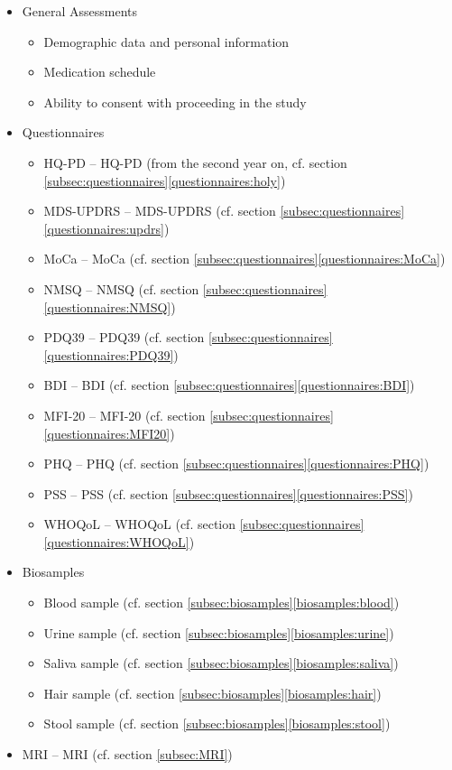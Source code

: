 \begin{itemize}[noitemsep,topsep=0pt]
\item General Assessments
\begin{itemize}[noitemsep,topsep=0pt]
\item Demographic data and personal information
\item Medication schedule
\item Ability to consent with proceeding in the study
\end{itemize}
\item Questionnaires
\begin{itemize}[noitemsep,topsep=0pt]
\item \acl{HQ-PD} -- \acs{HQ-PD} (from the second year on, cf. section \ref{subsec:questionnaires}\ref{questionnaires:holy})
\item \acl{MDS-UPDRS} -- \acs{MDS-UPDRS} (cf. section \ref{subsec:questionnaires}\ref{questionnaires:updrs})
\item \acl{MoCa} -- \acs{MoCa} (cf. section \ref{subsec:questionnaires}\ref{questionnaires:MoCa})
\item \acl{NMSQ} -- \acs{NMSQ} (cf. section \ref{subsec:questionnaires}\ref{questionnaires:NMSQ})
\item \acl{PDQ39} -- \acs{PDQ39} (cf. section \ref{subsec:questionnaires}\ref{questionnaires:PDQ39})
\item \acl{BDI} -- \acs{BDI} (cf. section \ref{subsec:questionnaires}\ref{questionnaires:BDI})
\item \acl{MFI-20} -- \acs{MFI-20} (cf. section \ref{subsec:questionnaires}\ref{questionnaires:MFI20})
\item \acl{PHQ} -- \acs{PHQ} (cf. section \ref{subsec:questionnaires}\ref{questionnaires:PHQ})
\item \acl{PSS} -- \acs{PSS} (cf. section \ref{subsec:questionnaires}\ref{questionnaires:PSS})
\item \acl{WHOQoL} -- \acs{WHOQoL} (cf. section \ref{subsec:questionnaires}\ref{questionnaires:WHOQoL})
\end{itemize}
\item Biosamples
\begin{itemize}[noitemsep,topsep=0pt]
\item Blood sample (cf. section \ref{subsec:biosamples}\ref{biosamples:blood})
\item Urine sample (cf. section \ref{subsec:biosamples}\ref{biosamples:urine})
\item Saliva sample (cf. section \ref{subsec:biosamples}\ref{biosamples:saliva})
\item Hair sample (cf. section \ref{subsec:biosamples}\ref{biosamples:hair})
\item Stool sample (cf. section \ref{subsec:biosamples}\ref{biosamples:stool})
\end{itemize}
\item \acl{MRI} -- \acs{MRI} (cf. section \ref{subsec:MRI}) 
\end{itemize}

